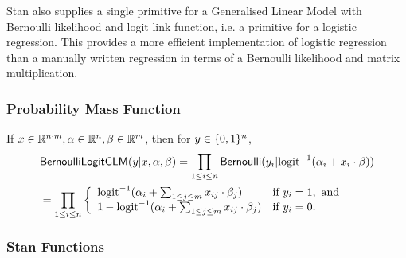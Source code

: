 Stan also supplies a single primitive for a Generalised Linear Model with
Bernoulli likelihood and logit link function, i.e. a primitive for a
logistic regression.
This provides a more efficient implementation of logistic regression
than a manually written regression in terms of a Bernoulli likelihood
and matrix multiplication.

\subsubsection{Probability Mass Function}

If $x\in \mathbb{R}^{n\cdot m}, \alpha \in \mathbb{R}^n, \beta\in \mathbb{R}^m$, then for
$y \in \{ 0,1 \}^n$,
\begin{align*}
&\mbox{\sf BernoulliLogitGLM}(y|x, \alpha, \beta)
=
\prod_{1\leq i \leq n}\mbox{\sf Bernoulli}(y_i|\mbox{logit}^{-1}(\alpha_i +
x_i\cdot \beta))\\
&= \prod_{1\leq i \leq n}
\left\{
\begin{array}{ll}
\mbox{logit}^{-1}(\alpha_i + \sum_{1\leq j\leq m}x_{ij}\cdot \beta_j) &
\mbox{if } y_i = 1, \mbox{ and}
\\
1 - \mbox{logit}^{-1}(\alpha_i + \sum_{1\leq j\leq m}x_{ij}\cdot \beta_j) &
\mbox{if } y_i = 0.
\end{array}
\right.
\end{align*}


\subsubsection{Stan Functions}

\begin{description}
%
%
\end{description}

